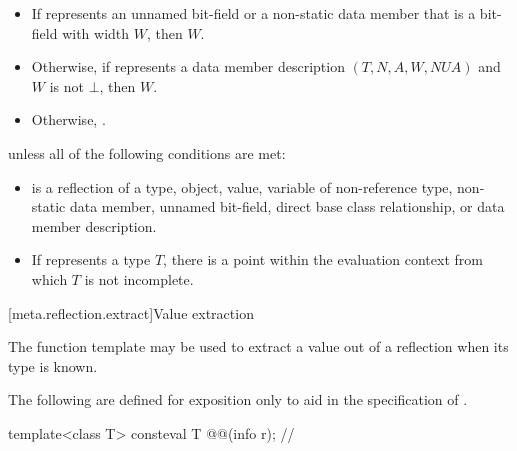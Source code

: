 \begin{itemdescr}
\pnum
\returns
\begin{itemize}
\item
  If  represents
  an unnamed bit-field
  or a non-static data member that is a bit-field
  with width $W$,
  then $W$.
\item
  Otherwise, if  represents a data member description
  $(T, N, A, W, \mathit{NUA})$
  and $W$ is not $\bot$,
  then $W$.
\item
  Otherwise, .
\end{itemize}

\pnum
\throws
{} unless
all of the following conditions are met:
\begin{itemize}
\item
{} is a reflection of a
type,
object,
value,
variable of non-reference type,
non-static data member,
unnamed bit-field,
direct base class relationship, or
data member description.
\item
If  represents a type $T$,
there is a point within the evaluation context from which $T$ is not incomplete.
\end{itemize}
\end{itemdescr}

[meta.reflection.extract]{Value extraction}

\pnum
The  function template may be used
to extract a value out of a reflection when its type is known.

\pnum
The following are defined for exposition only
to aid in the specification of .

\begin{itemdecl}
template<class T>
  consteval T @@(info r);      // \expos
\end{itemdecl}


